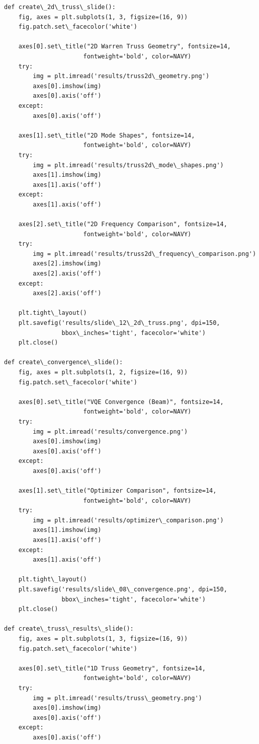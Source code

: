\documentclass[12pt, a4paper]{article}
\begin{document}
\begin{lstlisting}[style=codestyle, caption={{generate_presentation.py --- Slide Generator}}]
def create\_2d\_truss\_slide():
    fig, axes = plt.subplots(1, 3, figsize=(16, 9))
    fig.patch.set\_facecolor('white')

    axes[0].set\_title("2D Warren Truss Geometry", fontsize=14,
                      fontweight='bold', color=NAVY)
    try:
        img = plt.imread('results/truss2d\_geometry.png')
        axes[0].imshow(img)
        axes[0].axis('off')
    except:
        axes[0].axis('off')

    axes[1].set\_title("2D Mode Shapes", fontsize=14,
                      fontweight='bold', color=NAVY)
    try:
        img = plt.imread('results/truss2d\_mode\_shapes.png')
        axes[1].imshow(img)
        axes[1].axis('off')
    except:
        axes[1].axis('off')

    axes[2].set\_title("2D Frequency Comparison", fontsize=14,
                      fontweight='bold', color=NAVY)
    try:
        img = plt.imread('results/truss2d\_frequency\_comparison.png')
        axes[2].imshow(img)
        axes[2].axis('off')
    except:
        axes[2].axis('off')

    plt.tight\_layout()
    plt.savefig('results/slide\_12\_2d\_truss.png', dpi=150,
                bbox\_inches='tight', facecolor='white')
    plt.close()

def create\_convergence\_slide():
    fig, axes = plt.subplots(1, 2, figsize=(16, 9))
    fig.patch.set\_facecolor('white')

    axes[0].set\_title("VQE Convergence (Beam)", fontsize=14,
                      fontweight='bold', color=NAVY)
    try:
        img = plt.imread('results/convergence.png')
        axes[0].imshow(img)
        axes[0].axis('off')
    except:
        axes[0].axis('off')

    axes[1].set\_title("Optimizer Comparison", fontsize=14,
                      fontweight='bold', color=NAVY)
    try:
        img = plt.imread('results/optimizer\_comparison.png')
        axes[1].imshow(img)
        axes[1].axis('off')
    except:
        axes[1].axis('off')

    plt.tight\_layout()
    plt.savefig('results/slide\_08\_convergence.png', dpi=150,
                bbox\_inches='tight', facecolor='white')
    plt.close()

def create\_truss\_results\_slide():
    fig, axes = plt.subplots(1, 3, figsize=(16, 9))
    fig.patch.set\_facecolor('white')

    axes[0].set\_title("1D Truss Geometry", fontsize=14,
                      fontweight='bold', color=NAVY)
    try:
        img = plt.imread('results/truss\_geometry.png')
        axes[0].imshow(img)
        axes[0].axis('off')
    except:
        axes[0].axis('off')


\end{lstlisting}
\end{document}
